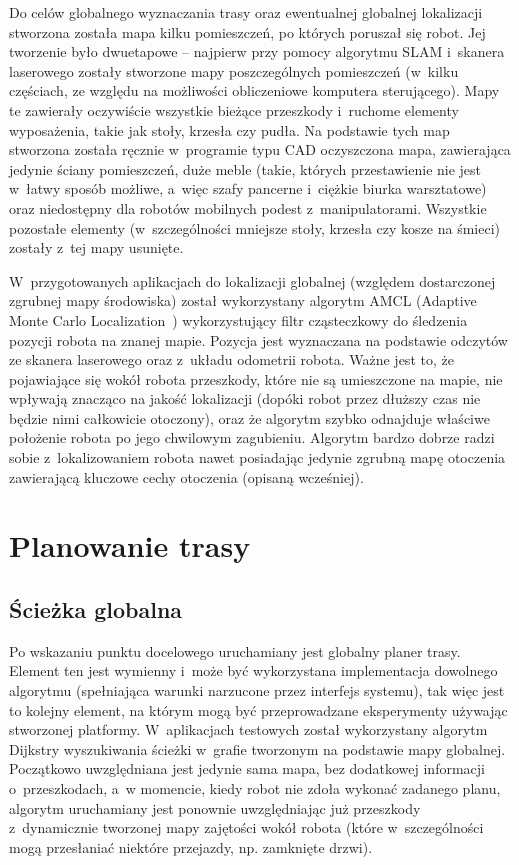 Do celów globalnego wyznaczania trasy oraz ewentualnej globalnej lokalizacji stworzona
została mapa kilku pomieszczeń, po których poruszał się robot. Jej tworzenie było
dwuetapowe -- najpierw przy pomocy algorytmu SLAM i~skanera laserowego zostały
stworzone mapy poszczególnych pomieszczeń (w~kilku częściach, ze względu na możliwości
obliczeniowe komputera sterującego). Mapy te zawierały oczywiście wszystkie bieżące
przeszkody i~ruchome elementy wyposażenia, takie jak stoły, krzesła czy pudła.
Na podstawie tych map stworzona została ręcznie w~programie typu CAD oczyszczona
mapa, zawierająca jedynie ściany pomieszczeń, duże meble (takie, których przestawienie
nie jest w~łatwy sposób możliwe, a~więc szafy pancerne i~ciężkie biurka warsztatowe)
oraz niedostępny dla robotów mobilnych podest z~manipulatorami. Wszystkie pozostałe
elementy (w~szczególności mniejsze stoły, krzesła czy kosze na śmieci) zostały z~tej
mapy usunięte.

W~przygotowanych aplikacjach do lokalizacji globalnej (względem dostarczonej
zgrubnej mapy środowiska) został wykorzystany algorytm AMCL (Adaptive Monte Carlo
Localization~\cite{fox2001kld}) wykorzystujący filtr cząsteczkowy do śledzenia
pozycji robota na znanej mapie. Pozycja jest wyznaczana na podstawie odczytów
ze skanera laserowego oraz z~układu odometrii robota. Ważne jest to, że pojawiające
się wokół robota przeszkody, które nie są umieszczone na mapie, nie wpływają znacząco
na jakość lokalizacji (dopóki robot przez dłuższy czas nie będzie nimi całkowicie
otoczony), oraz że algorytm szybko odnajduje właściwe położenie robota po jego
chwilowym zagubieniu. Algorytm bardzo dobrze radzi sobie z~lokalizowaniem robota nawet
posiadając jedynie zgrubną mapę otoczenia zawierającą kluczowe cechy otoczenia
(opisaną wcześniej).

\section{Planowanie trasy}

\subsection{Ścieżka globalna}

Po wskazaniu punktu docelowego uruchamiany jest globalny planer trasy. Element ten
jest wymienny i~może być wykorzystana implementacja dowolnego algorytmu (spełniająca
warunki narzucone przez interfejs systemu), tak więc jest to kolejny element, na którym
mogą być przeprowadzane eksperymenty używając stworzonej platformy. W~aplikacjach
testowych został wykorzystany algorytm Dijkstry wyszukiwania ścieżki w~grafie tworzonym
na podstawie mapy globalnej. Początkowo uwzględniana jest jedynie sama mapa, bez
dodatkowej informacji o~przeszkodach, a~w momencie, kiedy robot nie zdoła wykonać
zadanego planu, algorytm uruchamiany jest ponownie uwzględniając już przeszkody
z~dynamicznie tworzonej mapy zajętości wokół robota (które w~szczególności mogą
przesłaniać niektóre przejazdy, np. zamknięte drzwi).

